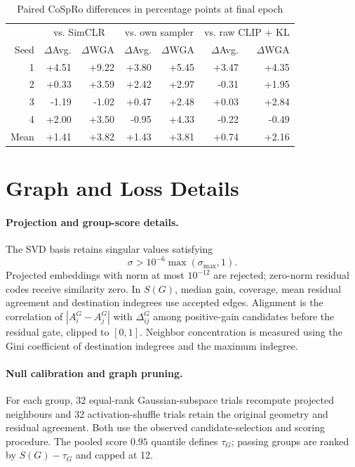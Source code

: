 \documentclass{article}
\begin{document}
\begin{table}[htbp]
\centering\small
\caption{Paired CoSpRo differences in percentage points at final epoch}
\begin{tabular}{rrrrrrr}
\toprule
& \multicolumn{2}{c}{vs. SimCLR} & \multicolumn{2}{c}{vs. own sampler} & \multicolumn{2}{c}{vs. raw CLIP + KL} \\
Seed & $\Delta$Avg. & $\Delta$WGA & $\Delta$Avg. & $\Delta$WGA & $\Delta$Avg. & $\Delta$WGA \\
\midrule
1 & +4.51 & +9.22 & +3.80 & +5.45 & +3.47 & +4.35 \\
2 & +0.33 & +3.59 & +2.42 & +2.97 & -0.31 & +1.95 \\
3 & -1.19 & -1.02 & +0.47 & +2.48 & +0.03 & +2.84 \\
4 & +2.00 & +3.50 & -0.95 & +4.33 & -0.22 & -0.49 \\
\midrule
Mean & +1.41 & +3.82 & +1.43 & +3.81 & +0.74 & +2.16 \\
\bottomrule
\end{tabular}
\end{table}

\section{Graph and Loss Details}\label{app:graphmath}

\paragraph{Projection and group-score details.}
The SVD basis retains singular values satisfying
\[
\sigma > 10^{-6}\max(\sigma_{\max},1).
\]
Projected embeddings with norm at most $10^{-12}$ are rejected; zero-norm residual codes receive similarity zero. In $S(G)$, median gain, coverage, mean residual agreement and destination indegrees use accepted edges. Alignment is the correlation of $|A_i^G-A_j^G|$ with $\Delta_{ij}^G$ among positive-gain candidates before the residual gate, clipped to $[0,1]$. Neighbor concentration is measured using the Gini coefficient of destination indegrees and the maximum indegree.

\paragraph{Null calibration and graph pruning.}
For each group, 32 equal-rank Gaussian-subspace trials recompute projected neighbours and 32 activation-shuffle trials retain the original geometry and residual agreement. Both use the observed candidate-selection and scoring procedure. The pooled score $0.95$ quantile defines $\tau_G$; passing groups are ranked by $S(G)-\tau_G$ and capped at 12.
\end{document}
